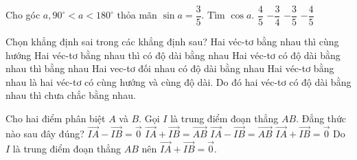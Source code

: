 \begin{ex}%
Cho góc $a, 90^{\circ} < a < 180^{\circ}$ thỏa mãn $\sin a=\dfrac{3}{5}$. Tìm $\cos a$.
\choice
{$\dfrac{4}{5}$}
{$-\dfrac{3}{4}$}
{$-\dfrac{3}{5}$}
{\True $-\dfrac{4}{5}$}
\end{ex}

\begin{ex}%
Chọn khẳng định sai trong các khẳng định sau?
\choice
{ Hai véc-tơ bằng nhau thì cùng hướng}
{Hai véc-tơ bằng nhau thì có độ dài bằng nhau}
{\True Hai véc-tơ có độ dài bằng nhau thì bằng nhau}
{Hai vec-tơ đối nhau có độ dài bằng nhau}
\loigiai
{ Hai véc-tơ bằng nhau là hai véc-tơ có cùng hướng và cùng độ dài. Do đó hai véc-tơ có độ dài bằng nhau thì chưa chắc bằng nhau.}
\end{ex}

\begin{ex}%
Cho hai điểm phân biệt $A$ và $B$. Gọi $I$ là trung điểm đoạn thẳng $AB$. Đẳng thức nào sau đây đúng?
\choice
{$\overrightarrow{IA}-\overrightarrow{IB}=\overrightarrow{0}$}
{$\overrightarrow{IA}+\overrightarrow{IB}=\overrightarrow{AB}$}
{$\overrightarrow{IA}-\overrightarrow{IB}=\overrightarrow{AB}$}
{\True $\overrightarrow{IA}+\overrightarrow{IB}=\overrightarrow{0}$}
\loigiai
{
Do  $I$ là trung điểm đoạn thẳng $AB$ nên $\overrightarrow{IA}+\overrightarrow{IB}=\overrightarrow{0}$.
}
\end{ex}

